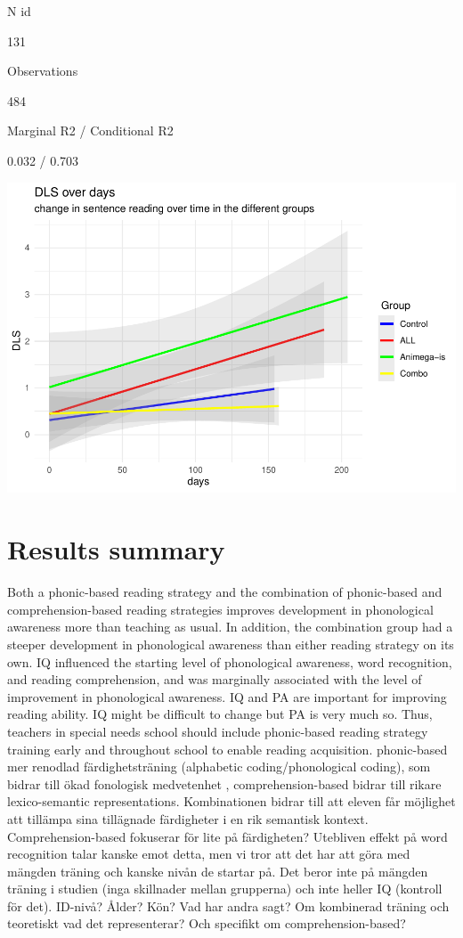 \documentclass[
  ,
]{article}
\begin{document}
N id

131

Observations

484

Marginal R2 / Conditional R2

0.032 / 0.703

\includegraphics{Effects_of_training_files/figure-latex/DLS-plot-1.pdf}

\hypertarget{results-summary}{%
\section{Results summary}\label{results-summary}}

Both a phonic-based reading strategy and the combination of phonic-based
and comprehension-based reading strategies improves development in
phonological awareness more than teaching as usual. In addition, the
combination group had a steeper development in phonological awareness
than either reading strategy on its own. IQ influenced the starting
level of phonological awareness, word recognition, and reading
comprehension, and was marginally associated with the level of
improvement in phonological awareness. IQ and PA are important for
improving reading ability. IQ might be difficult to change but PA is
very much so. Thus, teachers in special needs school should include
phonic-based reading strategy training early and throughout school to
enable reading acquisition. phonic-based mer renodlad färdighetsträning
(alphabetic coding/phonological coding), som bidrar till ökad fonologisk
medvetenhet , comprehension-based bidrar till rikare lexico-semantic
representations. Kombinationen bidrar till att eleven får möjlighet att
tillämpa sina tillägnade färdigheter i en rik semantisk kontext.
Comprehension-based fokuserar för lite på färdigheten? Utebliven effekt
på word recognition talar kanske emot detta, men vi tror att det har att
göra med mängden träning och kanske nivån de startar på. Det beror inte
på mängden träning i studien (inga skillnader mellan grupperna) och inte
heller IQ (kontroll för det). ID-nivå? Ålder? Kön? Vad har andra sagt?
Om kombinerad träning och teoretiskt vad det representerar? Och
specifikt om comprehension-based?
\end{document}
